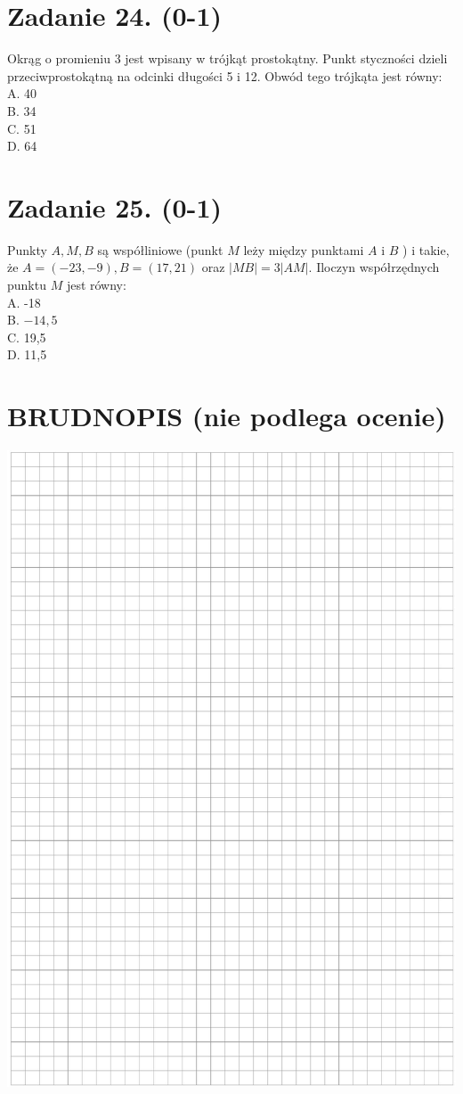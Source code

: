 \documentclass[10pt]{article}
\begin{document}
\section*{Zadanie 24. (0-1)}
Okrąg o promieniu 3 jest wpisany w trójkąt prostokątny. Punkt styczności dzieli przeciwprostokątną na odcinki długości 5 i 12. Obwód tego trójkąta jest równy:\\
A. 40\\
B. 34\\
C. 51\\
D. 64

\section*{Zadanie 25. (0-1)}
Punkty \(A, M, B\) są współliniowe (punkt \(M\) leży między punktami \(A\) i \(B\) ) i takie, że \(A=(-23,-9), B=(17,21)\) oraz \(|M B|=3|A M|\). Iloczyn współrzędnych punktu \(M\) jest równy:\\
A. -18\\
B. \(-14,5\)\\
C. 19,5\\
D. 11,5

\section*{BRUDNOPIS (nie podlega ocenie)}
\begin{center}
\includegraphics[max width=\textwidth]{2024_11_21_99eb8e6624b497a5af43g-09}
\end{center}
\end{document}
